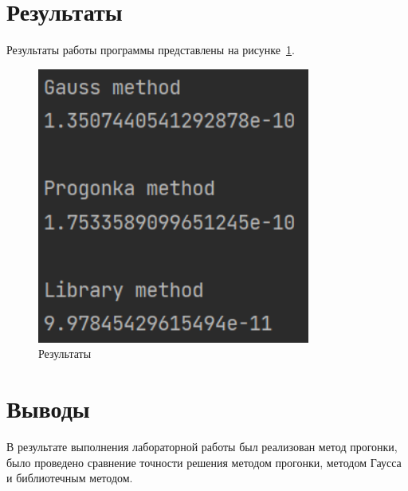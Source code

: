 \documentclass[a4paper, 14pt]{extarticle}
\begin{document}
\section{Результаты}\label{Sect::res}

Результаты работы программы представлены на рисунке~\ref{fig:img1}.

\begin{figure}[!htb]
	\centering
	\includegraphics[width=0.8\textwidth]{img1}
\caption{Результаты}
\label{fig:img1}
\end{figure}

\section{Выводы}\label{Sect::conclusion}

В результате выполнения лабораторной работы был реализован метод прогонки, было проведено сравнение точности решения методом прогонки, методом Гаусса и библиотечным методом.
\end{document}
